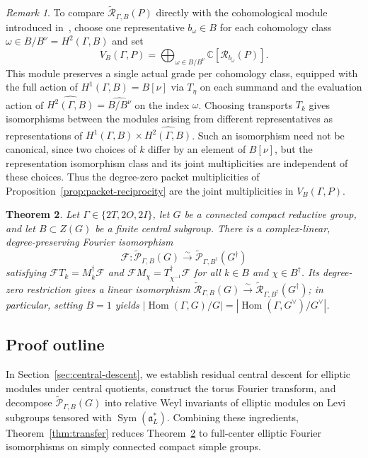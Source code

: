 \documentclass[11pt,a4paper,reqno]{amsart}
\theoremstyle{plain}
\newtheorem{theorem}{Theorem}[section]
\theoremstyle{definition}
\theoremstyle{remark}
\newtheorem{remark}[theorem]{Remark}
\numberwithin{equation}{section}
\DeclareMathOperator{\Hom}{Hom}
\DeclareMathOperator{\Sym}{Sym}
\newcommand{\CC}{\mathbb C}
\newcommand{\fa}{\mathfrak a}
\newcommand{\cR}{\mathcal R}
\newcommand{\wtP}{\widetilde{\mathcal P}}
\newcommand{\wtR}{\widetilde{\mathcal R}}
\begin{document}
\begin{remark}\label{rem:kt-module} To compare $\wtR_{\Gamma,B}(P)$ directly with the cohomological module introduced in~\cite[Definition~1.7]{kojima-tachikawa}, choose one representative $b_\omega\in B$ for each cohomology class $\omega\in B/B^\nu=H^2(\Gamma,B)$ and set
\[
V_B(\Gamma,P)=\bigoplus_{\omega\in B/B^\nu}\CC[\cR_{b_\omega}(P)].
\]
This module preserves a single actual grade per cohomology class, equipped with the full action of $H^1(\Gamma,B)=B[\nu]$ via $T_\eta$ on each summand and the evaluation action of $\widehat{H^2(\Gamma,B)}=\widehat{B/B^\nu}$ on the index $\omega$. Choosing transports $T_k$ gives isomorphisms between the modules arising from different representatives as representations of $H^1(\Gamma,B)\times\widehat{H^2(\Gamma,B)}$. Such an isomorphism need not be canonical, since two choices of $k$ differ by an element of $B[\nu]$, but the representation isomorphism class and its joint multiplicities are independent of these choices. Thus the degree-zero packet multiplicities of Proposition~\ref{prop:packet-reciprocity} are the joint multiplicities in $V_B(\Gamma,P)$.
\end{remark}

\begin{theorem}\label{thm:polyhedral-main}
Let $\Gamma\in\{2T,2O,2I\}$, let $G$ be a connected compact reductive group, and let $B\subset Z(G)$ be a finite central subgroup. There is a complex-linear, degree-preserving Fourier isomorphism
\begin{equation}\label{eq:final-graded-fourier}
\mathcal F\colon\wtP_{\Gamma,B}(G)\xrightarrow{\sim}\wtP_{\Gamma,B^\dagger}(G^\dagger)
\end{equation}
satisfying $\mathcal F T_k=M_k^\dagger\mathcal F$ and $\mathcal F M_\chi=T_{\chi^{-1}}^\dagger\mathcal F$ for all $k\in B$ and $\chi\in B^\dagger$. Its degree-zero restriction gives a linear isomorphism $\wtR_{\Gamma,B}(G)\xrightarrow{\sim}\wtR_{\Gamma,B^\dagger}(G^\dagger)$; in particular, setting $B=1$ yields $|\Hom(\Gamma,G)/G|=|\Hom(\Gamma,G^\vee)/G^\vee|$.
\end{theorem}

\subsection{Proof outline}

In Section~\ref{sec:central-descent}, we establish residual central descent for elliptic modules under central quotients, construct the torus Fourier transform, and decompose $\wtP_{\Gamma,B}(G)$ into relative Weyl invariants of elliptic modules on Levi subgroups tensored with $\Sym(\fa_L^*)$. Combining these ingredients, Theorem~\ref{thm:transfer} reduces Theorem~\ref{thm:polyhedral-main} to full-center elliptic Fourier isomorphisms on simply connected compact simple groups.
\end{document}

